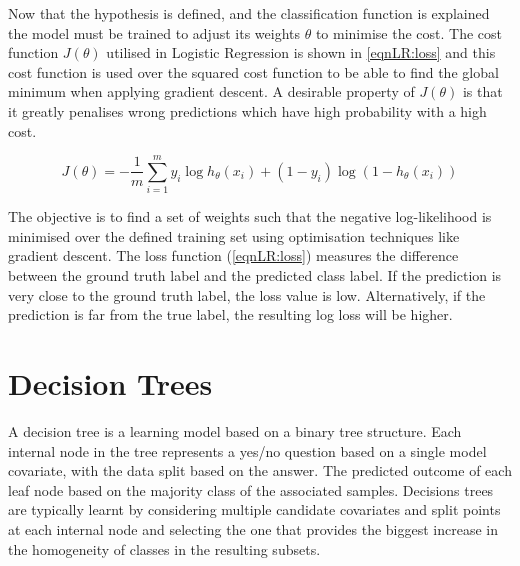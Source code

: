 Now that the hypothesis is defined, and the classification function is explained the model must be trained to adjust its weights $\theta$ to minimise the cost. The cost function $J(\theta)$ utilised in Logistic Regression is shown in \autoref{eqnLR:loss} and this cost function is used over the squared cost function to be able to find the global minimum when applying gradient descent. A desirable property of $J(\theta)$ is that it greatly penalises wrong predictions which have high probability with a high cost.


\begin{equation}
\label{eqnLR:loss}
J(\theta)=-\frac{1}{m} \sum_{i=1}^{m} y_{i} \log h_{\theta}\left(x_{i}\right)+\left(1-y_{i}\right) \log \left(1-h_{\theta}\left(x_{i}\right)\right)
\end{equation}

The objective is to find a set of weights such that the negative log-likelihood is minimised over the defined training set using optimisation techniques like gradient descent. The loss function (\autoref{eqnLR:loss}) measures the difference between the ground truth label and the predicted class label. If the prediction is very close to the ground truth label, the loss value is low. Alternatively, if the prediction is far from the true label, the resulting log loss will be higher.



\section{Decision Trees}
\label{method:DT}
A decision tree \cite{quinlan1986induction} is a learning model based on a binary tree structure. Each internal node in the tree represents a yes/no question based on a single model covariate, with the data split based on the answer. The predicted outcome of each leaf node based on the majority class of the associated samples. Decisions trees are typically learnt by considering multiple candidate covariates and split points at each internal node and selecting the one that provides the biggest increase in the homogeneity of classes in the resulting subsets.

